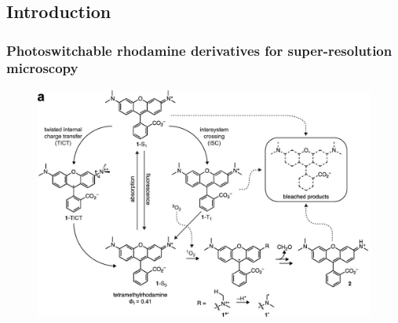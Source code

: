 \documentclass{ucetd}
\begin{document}
\clearpage

\mainmatter

\chapter{}

\section{Introduction}

\subsection{Photoswitchable rhodamine derivatives for super-resolution microscopy}


\begin{figure}
\begin{center}
\includegraphics[width=14cm]{Rhodamines.png}
\end{center}
\end{figure}
\end{document}
